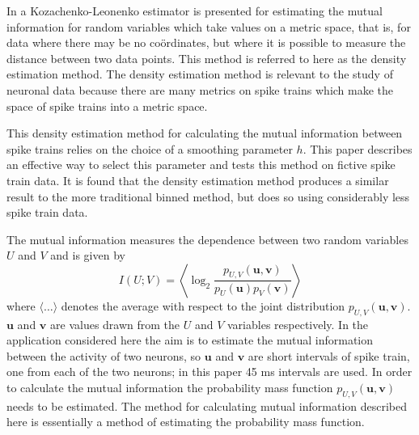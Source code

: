 \documentclass[12pt]{article}
\renewcommand{\u}{\mathbf{u}}
\renewcommand{\v}{\mathbf{v}}
\begin{document}
In \citet{Houghton2015} a Kozachenko-Leonenko estimator
\citep{KozachenkoLeonenko1987,Victor2002,KraskovEtAl2004,TobinHoughton2013}
is presented for estimating the mutual information for random
variables which take values on a metric space, that is, for data where
there may be no co\"{o}rdinates, but where it is possible to measure
the distance between two data points. This method is referred to here
as the density estimation method. The density estimation method is
relevant to the study of neuronal data because there are many metrics
on spike trains
\citep{VictorPurpura1996,vanRossum2001,AronovEtAl2003,HoughtonSen2008,HoughtonVictor2010}
which make the space of spike trains into a metric space.


This density estimation method for calculating the mutual information
between spike trains relies on the choice of a smoothing parameter
$h$. This paper describes an effective way to select this parameter
and tests this method on fictive spike train data. It is found that
the density estimation method produces a similar result to the more
traditional binned method, but does so using considerably less spike
train data.

The mutual information measures the dependence between two random
variables $U$ and $V$ and is given by
\begin{equation}
I(U;V)=\left\langle \log_2{\frac{p_{U,V}(\u,\v)}{p_U(\u)p_V(\v)}}\right\rangle
\end{equation}
where $\langle\ldots\rangle$ denotes the average with respect to the
joint distribution $p_{U,V}(\u,\v)$. $\u$ and $\v$ are values drawn
from the $U$ and $V$ variables respectively.  In the application
considered here the aim is to estimate the mutual information between
the activity of two neurons, so $\u$ and $\v$ are short intervals of
spike train, one from each of the two neurons; in this paper 45 ms
intervals are used. In order to calculate the mutual information the
probability mass function $p_{U,V}(\u,\v)$ needs to be estimated. The
method for calculating mutual information described here is
essentially a method of estimating the probability mass function.
\end{document}
